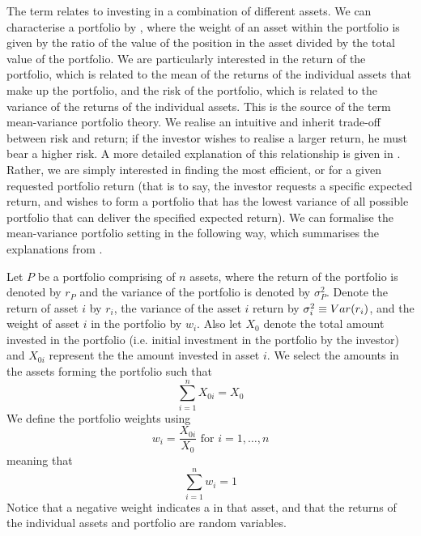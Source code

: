 The term  relates to investing in a combination of different assets.
We can characterise a portfolio by , where the weight of an asset within the portfolio is given by the ratio of the value of the position in the asset divided by the total value of the portfolio.
We are particularly interested in the return of the portfolio, which is related to the mean of the returns of the individual assets that make up the portfolio, and the risk of the portfolio, which is related to the variance of the returns of the individual assets.
This is the source of the term mean-variance portfolio theory.
We realise an intuitive and inherit trade-off between risk and return; if the investor wishes to realise a larger return, he must bear a higher risk.
A more detailed explanation of this relationship is given in \cite{Lue98,Kuh12e}.
Rather, we are simply interested in finding the most efficient, or  for a given requested portfolio return (that is to say, the investor requests a specific expected return, and wishes to form a portfolio that has the lowest variance of all possible portfolio that can deliver the specified expected return).
We can formalise the mean-variance portfolio setting in the following way, which summarises the explanations from \cite{Onn02,Lue98,Kuh12e}.

Let $P$ be a portfolio comprising of $n$ assets, where the return of the portfolio is denoted by $r_{P}$ and the variance of the portfolio is denoted by $\sigma^{2}_{P}$.
Denote the return of asset $i$ by $r_{i}$, the variance of the asset $i$ return by $\sigma^{2}_{i} \equiv Var(r_{i})$, and the weight of asset $i$ in the portfolio by $w_{i}$.
Also let $X_{0}$ denote the total amount invested in the portfolio (i.e. initial investment in the portfolio by the investor) and $X_{0i}$ represent the the amount invested in asset $i$.
We select the amounts in the assets forming the portfolio such that
\begin{equation}
	\label{eq:portfolioAmounts}
	\sum_{i=1}^{n} X_{0i} = X_{0}
\end{equation}
We define the portfolio weights using
\begin{equation}
	\label{eq:portfolioWeights}
	w_{i} = \frac{X_{0i}}{X_{0}} \text{ for } i = 1,\dots,n
\end{equation}
meaning that
\begin{equation}
	\label{eq:portfolioWeightsSum}
	\sum_{i=1}^{n} w_{i} = 1
\end{equation}
Notice that a negative weight indicates a  in that asset, and that the returns of the individual assets and portfolio are random variables.

